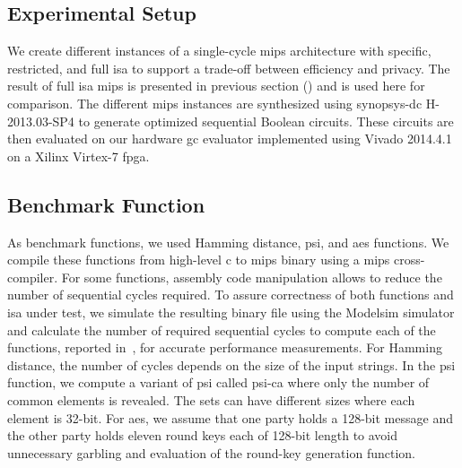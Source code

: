 \subsection{Experimental Setup} \label{sec:eval-mips-sfe-setup}
We create different instances of a single-cycle \gls{mips} architecture with specific, restricted, and full \acrshort{isa} to support a trade-off between efficiency and privacy.
The result of full \acrshort{isa} \gls{mips} is presented in previous section () and is used here for comparison.
The different \gls{mips} instances are synthesized using \gls{synopsys-dc} H-2013.03-SP4 to generate optimized sequential Boolean circuits.
These circuits are then evaluated on our hardware \acrshort{gc} evaluator implemented using Vivado 2014.4.1 on a Xilinx Virtex-7 \acrshort{fpga}.

\subsection{Benchmark Function}\label{ssect:eval-mips-sfe-bench}
As benchmark functions, we used Hamming distance, \acrfull{psi}, and \acrshort{aes} functions.
We compile these functions from high-level \gls{c} to \gls{mips} binary using a \gls{mips} cross-compiler.
For some functions, assembly code manipulation allows to reduce the number of sequential cycles required.
To assure correctness of both functions and \acrshort{isa} under test, we simulate the resulting binary file using the Modelsim simulator and calculate the number of required sequential cycles to compute each of the functions, reported in~, for accurate performance measurements.
For Hamming distance, the number of cycles depends on the size of the input strings.
In the \acrshort{psi} function, we compute a variant of \acrshort{psi} called \acrfull{psi-ca} where only the number of common elements is revealed.
The sets can have different sizes where each element is 32-bit.
For \acrshort{aes}, we assume that one party holds a 128-bit message and the other party holds eleven round keys each of 128-bit length to avoid unnecessary garbling and evaluation of the round-key generation function.

